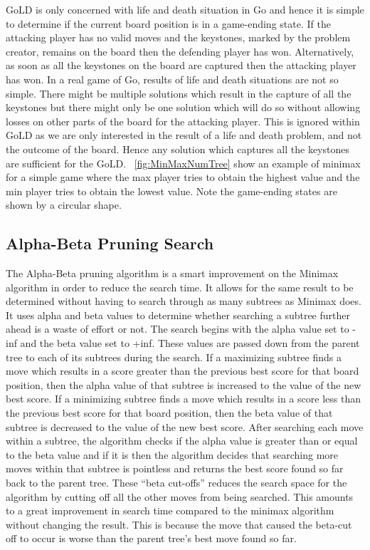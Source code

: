 \documentclass{l4proj}
\begin{document}
GoLD is only concerned with life and death situation in Go and hence it is simple to determine if the current board position is in a game-ending state. If the attacking player has no valid moves and the keystones, marked by the problem creator, remains on the board then the defending player has won. Alternatively, as soon as all the keystones on the board are captured then the attacking player has won. In a real game of Go, results of life and death situations are not so simple. There might be multiple solutions which result in the capture of all the keystones but there might only be one solution which will do so without allowing losses on other parts of the board for the attacking player. This is ignored within GoLD as we are only interested in the result of a life and death problem, and not the outcome of the board. Hence any solution which captures all the keystones are sufficient for the GoLD. ~\autoref{fig:MinMaxNumTree} show an example of minimax for a simple game where the max player tries to obtain the highest value and the min player tries to obtain the lowest value. Note the game-ending states are shown by a circular shape.

\subsection{Alpha-Beta Pruning Search}
The Alpha-Beta pruning algorithm is a smart improvement on the Minimax algorithm in order to reduce the search time. It allows for the same result to be determined without having to search through as many subtrees as Minimax does. It uses alpha and beta values to determine whether searching a subtree further ahead is a waste of effort or not. The search begins with the alpha value set to -inf and the beta value set to +inf. These values are passed down from the parent tree to each of its subtrees during the search. If a maximizing subtree finds a move which results in a score greater than the previous best score for that board position, then the alpha value of that subtree is increased to the value of the new best score. If a minimizing subtree finds a move which results in a score less than the previous best score for that board position, then the beta value of that subtree is decreased to the value of the new best score. After searching each move within a subtree, the algorithm checks if the alpha value is greater than or equal to the beta value and if it is then the algorithm decides that searching more moves within that subtree is pointless and returns the best score found so far back to the parent tree. These “beta cut-offs” reduces the search space for the algorithm by cutting off all the other moves from being searched. This amounts to a great improvement in search time compared to the minimax algorithm without changing the result. This is because the move that caused the beta-cut off to occur is worse than the parent tree’s best move found so far.
\end{document}
